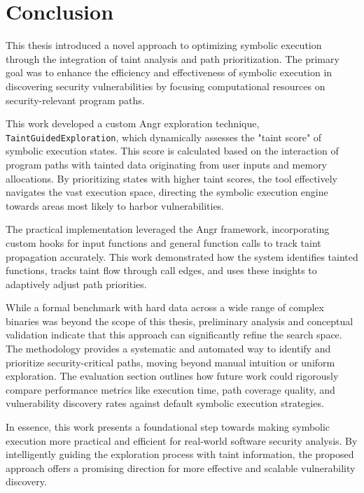 \chapter{Conclusion}


This thesis introduced a novel approach to optimizing symbolic execution through the integration of taint analysis and path prioritization. The primary goal was to enhance the efficiency and effectiveness of symbolic execution in discovering security vulnerabilities by focusing computational resources on security-relevant program paths.

This work developed a custom Angr exploration technique, \texttt{TaintGuidedExploration}, which dynamically assesses the "taint score" of symbolic execution states. This score is calculated based on the interaction of program paths with tainted data originating from user inputs and memory allocations. By prioritizing states with higher taint scores, the tool effectively navigates the vast execution space, directing the symbolic execution engine towards areas most likely to harbor vulnerabilities.

The practical implementation leveraged the Angr framework, incorporating custom hooks for input functions and general function calls to track taint propagation accurately. This work demonstrated how the system identifies tainted functions, tracks taint flow through call edges, and uses these insights to adaptively adjust path priorities.

While a formal benchmark with hard data across a wide range of complex binaries was beyond the scope of this thesis, preliminary analysis and conceptual validation indicate that this approach can significantly refine the search space. The methodology provides a systematic and automated way to identify and prioritize security-critical paths, moving beyond manual intuition or uniform exploration. The evaluation section outlines how future work could rigorously compare performance metrics like execution time, path coverage quality, and vulnerability discovery rates against default symbolic execution strategies.

In essence, this work presents a foundational step towards making symbolic execution more practical and efficient for real-world software security analysis. By intelligently guiding the exploration process with taint information, the proposed approach offers a promising direction for more effective and scalable vulnerability discovery.
